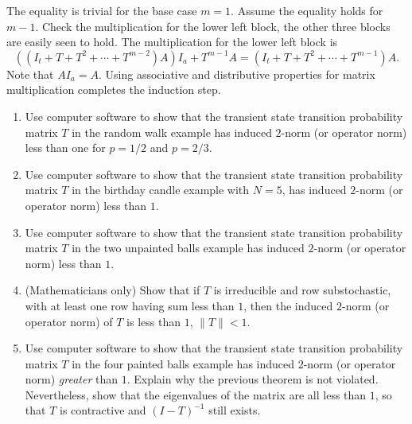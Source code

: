 \documentclass[12pt]{article}
\begin{document}
\begin{solution}
    The equality is trivial for the base case \( m=1 \).  Assume the
    equality holds for \( m-1 \).  Check the multiplication for the
    lower left block, the other three blocks are easily seen to hold.
    The multiplication for the lower left block is
    \[
        \left( (I_t + T + T^2 + \cdots + T^{m-2})A \right) I_a + T^{m-1}A
        = (I_t + T + T^2 + \cdots + T^{m-1})A.
    \] Note that \( A I_a = A \). Using associative and distributive
    properties for matrix multiplication completes the induction step.
\end{solution}

\begin{exercise}
    \begin{enumerate}[label=(\alph*)]
        \item
            Use computer software to show that the transient state
            transition probability matrix \( T \) in the random walk
            example has induced \( 2 \)-norm (or operator norm) less
            than one for \( p = 1/2 \) and \( p = 2/3 \).
        \item
            Use computer software to show that the transient state
            transition probability matrix \( T \) in the birthday candle
            example with \( N=5 \), has induced \( 2 \)-norm (or
            operator norm) less than \( 1 \).
        \item
            Use computer software to show that the transient state
            transition probability matrix \( T \) in the two unpainted
            balls example has induced \( 2 \)-norm (or operator norm)
            less than \( 1 \).
        \item
            (Mathematicians only) Show that if \( T \) is irreducible
            and row substochastic, with at least one row having sum less
            than \( 1 \), then the induced \( 2 \)-norm (or operator
            norm) of \( T \) is less than \( 1 \), \( \| T \| < 1 \).
        \item
            Use computer software to show that the transient state
            transition probability matrix \( T \) in the four painted
            balls example has induced \( 2 \)-norm (or operator norm)
            \emph{greater} than \( 1 \).  Explain why the previous
            theorem is not violated.  Nevertheless, show that the
            eigenvalues of the matrix are all less than \( 1 \), so that
            \( T \) is contractive and \( (I-T)^{-1} \) still exists.
    \end{enumerate}
\end{exercise}
\end{document}
